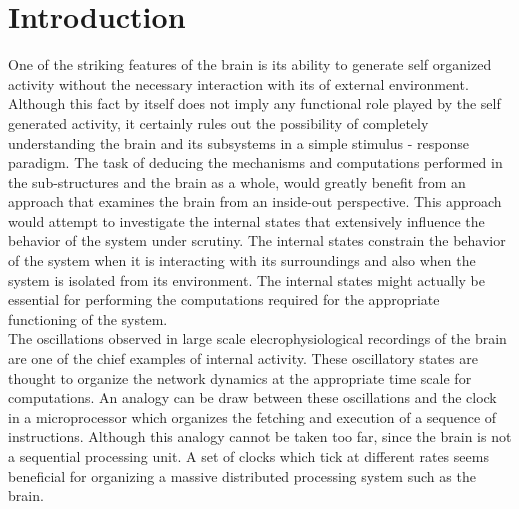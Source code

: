 \chapter{Introduction} 

\label{intro}

One of the striking features of the brain is its ability to generate self organized activity without the necessary interaction with its of external environment. Although this fact by itself does not imply any functional role played by the self generated activity, it certainly rules out the possibility of completely understanding the brain and its subsystems in a simple stimulus - response paradigm. The task of deducing the mechanisms and computations performed in the sub-structures and  the brain as a whole, would greatly benefit from an approach that examines the brain from an inside-out perspective. This approach would attempt to investigate the internal states that extensively influence the behavior of the system under scrutiny. The internal states constrain the behavior of the system when it is interacting with its surroundings and also when the system is isolated from its environment. The internal states might actually be essential for performing the computations required for the appropriate functioning of the system. \\

The oscillations observed in large scale elecrophysiological recordings of the brain are one of the chief examples of internal  activity. These oscillatory states are thought to organize the network dynamics at the appropriate time scale for computations. An analogy can be draw between these oscillations and the clock in a microprocessor which organizes the fetching and execution of a sequence of instructions. Although this analogy cannot be taken too far, since the brain is not a sequential processing unit. A set of clocks which tick at different rates seems beneficial for organizing a massive distributed processing system such as the brain. \\

